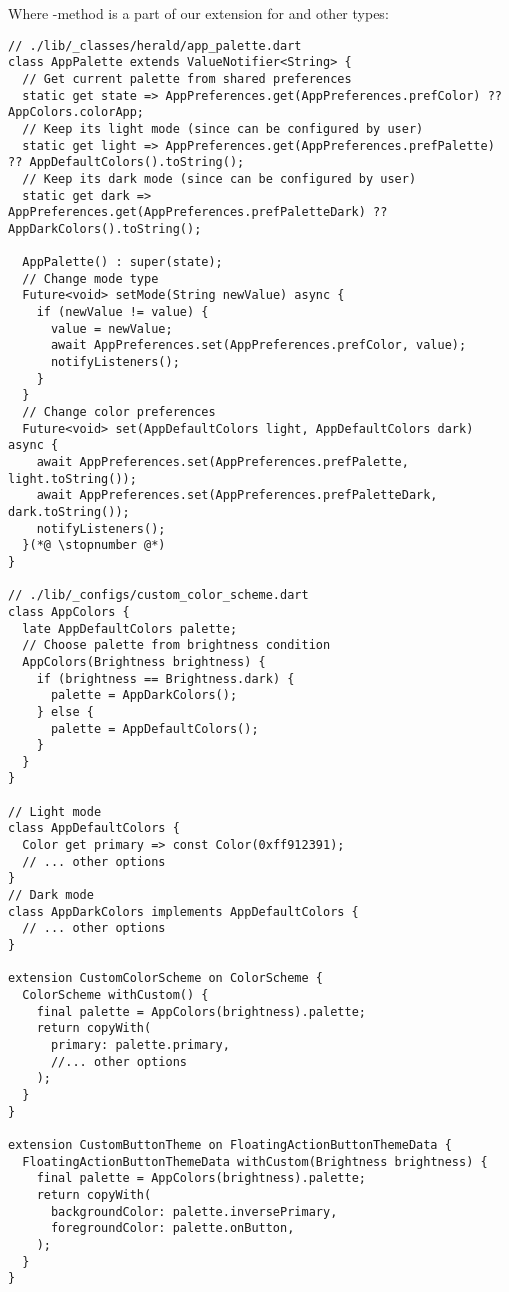 \noindent Where -method is a part of our extension for  and other types:

\begin{lstlisting}
// ./lib/_classes/herald/app_palette.dart
class AppPalette extends ValueNotifier<String> {
  // Get current palette from shared preferences
  static get state => AppPreferences.get(AppPreferences.prefColor) ?? AppColors.colorApp;
  // Keep its light mode (since can be configured by user)
  static get light => AppPreferences.get(AppPreferences.prefPalette) ?? AppDefaultColors().toString();
  // Keep its dark mode (since can be configured by user)
  static get dark => AppPreferences.get(AppPreferences.prefPaletteDark) ?? AppDarkColors().toString();

  AppPalette() : super(state);
  // Change mode type
  Future<void> setMode(String newValue) async {
    if (newValue != value) {
      value = newValue;
      await AppPreferences.set(AppPreferences.prefColor, value);
      notifyListeners();
    }
  }
  // Change color preferences
  Future<void> set(AppDefaultColors light, AppDefaultColors dark) async {
    await AppPreferences.set(AppPreferences.prefPalette, light.toString());
    await AppPreferences.set(AppPreferences.prefPaletteDark, dark.toString());
    notifyListeners();
  }(*@ \stopnumber @*)
}

// ./lib/_configs/custom_color_scheme.dart
class AppColors {
  late AppDefaultColors palette;
  // Choose palette from brightness condition
  AppColors(Brightness brightness) {
    if (brightness == Brightness.dark) {
      palette = AppDarkColors();
    } else {
      palette = AppDefaultColors();
    }
  }
}

// Light mode
class AppDefaultColors {
  Color get primary => const Color(0xff912391);
  // ... other options
}
// Dark mode
class AppDarkColors implements AppDefaultColors {
  // ... other options
}

extension CustomColorScheme on ColorScheme {
  ColorScheme withCustom() {
    final palette = AppColors(brightness).palette;
    return copyWith(
      primary: palette.primary,
      //... other options
    );
  }
}

extension CustomButtonTheme on FloatingActionButtonThemeData {
  FloatingActionButtonThemeData withCustom(Brightness brightness) {
    final palette = AppColors(brightness).palette;
    return copyWith(
      backgroundColor: palette.inversePrimary,
      foregroundColor: palette.onButton,
    );
  }
}
\end{lstlisting}


